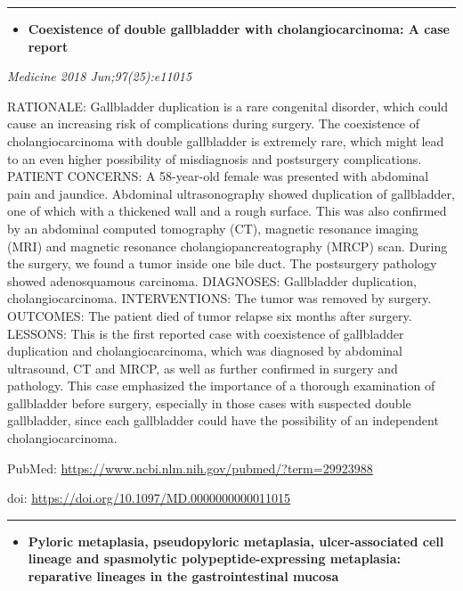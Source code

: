 \documentclass[]{article}
\providecommand{\tightlist}{%
  \setlength{\itemsep}{0pt}\setlength{\parskip}{0pt}}
\begin{document}
\begin{center}\rule{0.5\linewidth}{\linethickness}\end{center}

\begin{itemize}
\tightlist
\item
  \textbf{Coexistence of double gallbladder with cholangiocarcinoma: A
  case report}
\end{itemize}

\emph{Medicine 2018 Jun;97(25):e11015}

RATIONALE: Gallbladder duplication is a rare congenital disorder, which
could cause an increasing risk of complications during surgery. The
coexistence of cholangiocarcinoma with double gallbladder is extremely
rare, which might lead to an even higher possibility of misdiagnosis and
postsurgery complications. PATIENT CONCERNS: A 58-year-old female was
presented with abdominal pain and jaundice. Abdominal ultrasonography
showed duplication of gallbladder, one of which with a thickened wall
and a rough surface. This was also confirmed by an abdominal computed
tomography (CT), magnetic resonance imaging (MRI) and magnetic resonance
cholangiopancreatography (MRCP) scan. During the surgery, we found a
tumor inside one bile duct. The postsurgery pathology showed
adenosquamous carcinoma. DIAGNOSES: Gallbladder duplication,
cholangiocarcinoma. INTERVENTIONS: The tumor was removed by surgery.
OUTCOMES: The patient died of tumor relapse six months after surgery.
LESSONS: This is the first reported case with coexistence of gallbladder
duplication and cholangiocarcinoma, which was diagnosed by abdominal
ultrasound, CT and MRCP, as well as further confirmed in surgery and
pathology. This case emphasized the importance of a thorough examination
of gallbladder before surgery, especially in those cases with suspected
double gallbladder, since each gallbladder could have the possibility of
an independent cholangiocarcinoma.

PubMed: \url{https://www.ncbi.nlm.nih.gov/pubmed/?term=29923988}

doi: \url{https://doi.org/10.1097/MD.0000000000011015}

{}

{}

\begin{center}\rule{0.5\linewidth}{\linethickness}\end{center}

\begin{itemize}
\tightlist
\item
  \textbf{Pyloric metaplasia, pseudopyloric metaplasia, ulcer-associated
  cell lineage and spasmolytic polypeptide-expressing metaplasia:
  reparative lineages in the gastrointestinal mucosa}
\end{itemize}
\end{document}
